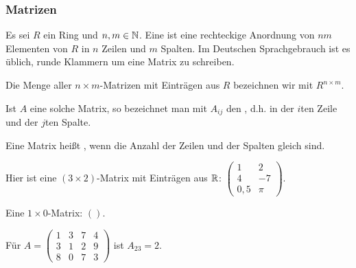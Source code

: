 \subsubsection{Matrizen}

\begin{definition}
    Es sei $R$ ein Ring und $n,m\in\mathbb{N}$. Eine  ist eine rechteckige Anordnung von $nm$ Elementen von $R$ in $n$ Zeilen und $m$ Spalten. Im Deutschen Sprachgebrauch ist es üblich, runde Klammern um eine Matrix zu schreiben.

    Die Menge aller $n\times m$-Matrizen mit Einträgen aus $R$ bezeichnen wir mit $R^{n\times m}$.

    Ist $A$ eine solche Matrix, so bezeichnet man mit $A_{ij}$ den , d.h. in der $i$ten Zeile und der $j$ten Spalte.

    Eine Matrix heißt , wenn die Anzahl der Zeilen und
    der Spalten gleich sind.
\end{definition}

\begin{example}
    Hier ist eine $(3\times2)$-Matrix mit Einträgen aus $\mathbb{R}$:
    $\begin{pmatrix}
         1& 2\\4& -7\\0,5& \pi
    \end{pmatrix}$.
\end{example}

\begin{example}
    Eine $1\times 0$-Matrix: $()$.
\end{example}

\begin{example}
    Für $A=\begin{pmatrix}
               1& 3& 7& 4\\3& 1& 2& 9\\8& 0& 7& 3
    \end{pmatrix}$
    ist $A_{23}=2$.
\end{example}

